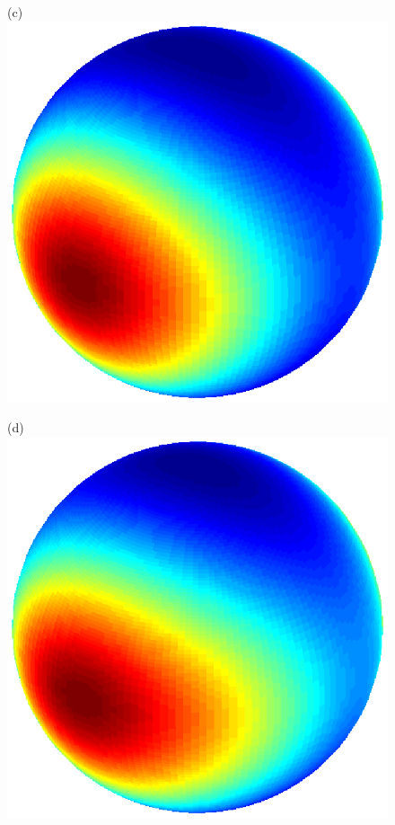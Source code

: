 \documentclass[dvips,aoas,preprint]{imsart}
\numberwithin{equation}{section}
\theoremstyle{plain}
\begin{document}
\begin{figure}[!htbp]
\begin{minipage}[]{0.12\textwidth}
    \end{minipage}
    \begin{minipage}[]{0.12\textwidth}
      \centering
      (c)
      \includegraphics*[width=\textwidth]{figure1f1.eps}
    \end{minipage}
    \begin{minipage}[]{0.12\textwidth}
      \centering
      (d)
      \includegraphics*[width=\textwidth]{figure1g1.eps}

\end{minipage}
\end{figure}
\end{document}
